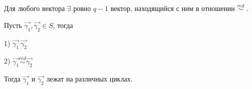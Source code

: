 Для любого вектора $\exists$ ровно $q-1$ вектор, находящийся с ним в отношении $\stackrel{red}{\sim}$ .

\thr
Пусть $\vec{\gamma_1}, \vec{\gamma_2} \in S$, тогда

1) $\vec{\gamma_1} ~ \vec{\gamma_2}$

2) $\vec{\gamma_1} \stackrel{red}{\sim} \vec{\gamma_2}$

Тогда $\vec{\gamma_1}$ и $\vec{\gamma_2}$ лежат на различных циклах.
